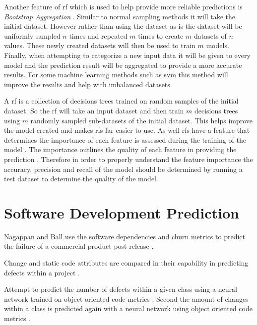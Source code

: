 Another feature of \gls{rf} which is used to help provide more reliable predictions is \textit{Bootstrap Aggregation} \cite{Westland2011}. Similar to normal sampling methods it will take the initial dataset. However rather than using the dataset as is the dataset will be uniformly sampled $n$ times and repeated $m$ times to create $m$ datasets of $n$ values. These newly created datasets will then be used to train $m$ models. Finally, when attempting to categorize a new input data it will be given to every model and the prediction result will be aggregated to provide a more accurate results. For some machine learning methods such as \gls{svm} this method will improve the results and help with imbalanced datasets.

A \gls{rf} is a collection of decisions trees trained on random samples of the initial dataset. So the \gls{rf} will take an input dataset and then train $m$ decisions trees using $m$ randomly sampled sub-datasets of the initial dataset. This helps improve the model created and makes \gls{rf}s far easier to use. As well \gls{rf}s have a feature that determines the importance of each feature is assessed during the training of the model \cite{Westland2011}. The importance outlines the quality of each feature in providing the prediction \cite{Verikas2011}. Therefore in order to properly understand the feature importance the accuracy, precision and recall of the model should be determined by running a test dataset to determine the quality of the model.

\section{Software Development Prediction}

Nagappan and Ball use the software dependencies and churn metrics to predict the failure of a commercial product post release \cite{Nagappan2007}.

Change and static code attributes are compared in their capability in predicting defects within a project \cite{Moser2008}.

Attempt to predict the number of defects within a given class using a neural network trained on object oriented code metrics \cite{Thwin2005}. Second the amount of changes within a class is predicted again with a neural network using object oriented code metrics \cite{Thwin2005}.


